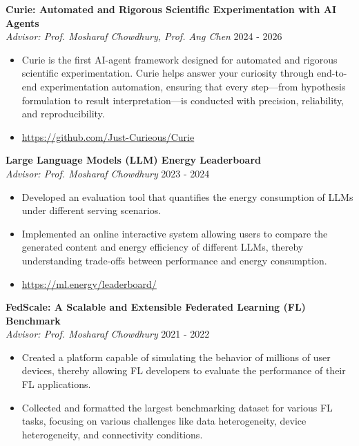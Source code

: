 \documentclass{article}
\begin{document}
\noindent 
\textbf{Curie: Automated and Rigorous Scientific Experimentation with AI Agents
}\\
\quad \textit{Advisor: Prof. Mosharaf Chowdhury, Prof. Ang Chen} \hfill 2024 - 2026
\begin{itemize}[noitemsep,nolistsep,leftmargin=*]
\item Curie is the first AI-agent framework designed for automated and rigorous scientific experimentation. Curie helps answer your curiosity through end-to-end experimentation automation, ensuring that every step—from hypothesis formulation to result interpretation—is conducted with precision, reliability, and reproducibility.
\item \url{https://github.com/Just-Curieous/Curie} 
\end{itemize}

\noindent 
\textbf{Large Language Models (LLM) Energy Leaderboard} \\
\quad \textit{Advisor: Prof. Mosharaf Chowdhury} \hfill 2023 - 2024
\begin{itemize}[noitemsep,nolistsep,leftmargin=*]
\item Developed an evaluation tool that quantifies the energy consumption of LLMs under different serving scenarios.
\item  Implemented an online interactive system allowing users to compare the generated content and energy efficiency of different LLMs, thereby understanding trade-offs between performance and energy consumption.
\item \url{https://ml.energy/leaderboard/}
\end{itemize}
 
\noindent 
\textbf{FedScale: A Scalable and Extensible Federated Learning (FL) Benchmark}
\\
\quad \textit{Advisor: Prof. Mosharaf Chowdhury} \hfill 2021 - 2022
\begin{itemize}[noitemsep,nolistsep,leftmargin=*]
\item Created a platform capable of simulating the behavior of millions of user devices, thereby allowing FL developers to evaluate the performance of their FL applications.

\item Collected and formatted the largest benchmarking dataset for various FL tasks, focusing on various challenges like data heterogeneity, device heterogeneity, and connectivity conditions.

\end{itemize}
\end{document}
